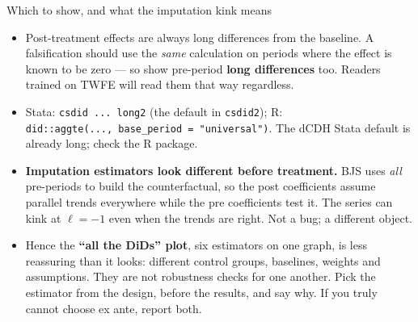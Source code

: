 \documentclass[
  11pt,
  ignorenonframetext,
  aspectratio=169,
]{beamer}
\providecommand{\tightlist}{%
  \setlength{\itemsep}{0pt}\setlength{\parskip}{0pt}}
\begin{document}
\begin{frame}[fragile]{Which to show, and what the imputation kink
means}
\protect{}\label{which-to-show-and-what-the-imputation-kink-means}
\begin{itemize}
\tightlist
\item
  Post-treatment effects are always long differences from the baseline.
  A falsification should use the \emph{same} calculation on periods
  where the effect is known to be zero --- so show pre-period
  \textbf{long differences} too. Readers trained on TWFE will read them
  that way regardless.
\item
  Stata: \texttt{csdid\ ...\ long2} (the default in \texttt{csdid2}); R:
  \texttt{did::aggte(...,\ base\_period\ =\ "universal")}. The dCDH
  Stata default is already long; check the R package.
\end{itemize}

\vspace{0.3em}

\begin{itemize}
\tightlist
\item
  \textbf{Imputation estimators look different before treatment.} BJS
  uses \emph{all} pre-periods to build the counterfactual, so the post
  coefficients assume parallel trends everywhere while the pre
  coefficients test it. The series can kink at \(\ell = -1\) even when
  the trends are right. Not a bug; a different object.
\item
  Hence the \textbf{``all the DiDs'' plot}, six estimators on one graph,
  is less reassuring than it looks: different control groups, baselines,
  weights and assumptions. They are not robustness checks for one
  another. Pick the estimator from the design, before the results, and
  say why. If you truly cannot choose ex ante, report both.
\end{itemize}
\end{frame}
\end{document}
